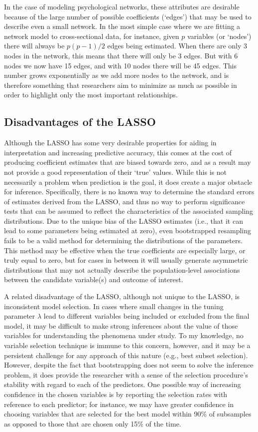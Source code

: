 In the case of modeling psychological networks, these attributes are desirable because of the large number of possible coefficients (`edges') that may be used to describe even a small network. In the most simple case where we are fitting a network model to cross-sectional data, for instance, given $p$ variables (or `nodes') there will always be $p(p - 1)/2$ edges being estimated. When there are only 3 nodes in the network, this means that there will only be 3 edges. But with 6 nodes we now have 15 edges, and with 10 nodes there will be 45 edges. This number grows exponentially as we add more nodes to the network, and is therefore something that researchers aim to minimize as much as possible in order to highlight only the most important relationships. 

\subsection{Disadvantages of the LASSO}
Although the LASSO has some very desirable properties for aiding in interpretation and increasing predictive accuracy, this comes at the cost of producing coefficient estimates that are biased towards zero, and as a result may not provide a good representation of their `true' values. While this is not necessarily a problem when prediction is the goal, it does create a major obstacle for inference. Specifically, there is no known way to determine the standard errors of estimates derived from the LASSO, and thus no way to perform significance tests that can be assumed to reflect the characteristics of the associated sampling distributions. Due to the unique bias of the LASSO estimates (i.e., that it can lead to some parameters being estimated at zero), even bootstrapped resampling fails to be a valid method for determining the distributions of the parameters. This method may be effective when the true coefficients are especially large, or truly equal to zero, but for cases in between it will usually generate asymmetric distributions that may not actually describe the population-level associations between the candidate variable(s) and outcome of interest. 

A related disadvantage of the LASSO, although not unique to the LASSO, is inconsistent model selection. In cases where small changes in the tuning parameter $\lambda$ lead to different variables being included or excluded from the final model, it may be difficult to make strong inferences about the value of those variables for understanding the phenomena under study. To my knowledge, no variable selection technique is immune to this concern, however, and it may be a persistent challenge for any approach of this nature (e.g., best subset selection). However, despite the fact that bootstrapping does not seem to solve the inference problem, it does provide the researcher with a sense of the selection procedure's stability with regard to each of the predictors. One possible way of increasing confidence in the chosen variables is by reporting the selection rates with reference to each predictor; for instance, we may have greater confidence in choosing variables that are selected for the best model within 90\% of subsamples as opposed to those that are chosen only 15\% of the time.


